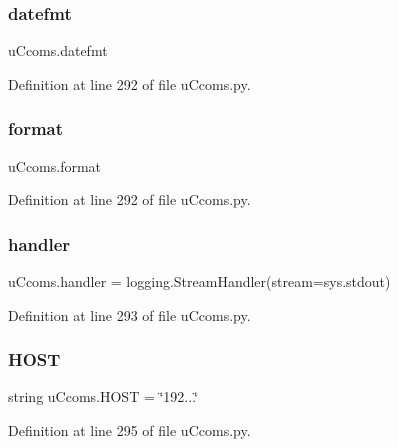 \subsubsection{\texorpdfstring{datefmt}{datefmt}}
{\footnotesize\ttfamily u\+Ccoms.\+datefmt}



Definition at line 292 of file u\+Ccoms.\+py.

\mbox{\label{namespaceu_ccoms_a1070a9e7db6d33b9ffcd595bdecd97a2}} 
\subsubsection{\texorpdfstring{format}{format}}
{\footnotesize\ttfamily u\+Ccoms.\+format}



Definition at line 292 of file u\+Ccoms.\+py.

\mbox{\label{namespaceu_ccoms_abcdcaa8cce9916174e18e8c89c6ca6aa}} 
\subsubsection{\texorpdfstring{handler}{handler}}
{\footnotesize\ttfamily u\+Ccoms.\+handler = logging.\+Stream\+Handler(stream=sys.\+stdout)}



Definition at line 293 of file u\+Ccoms.\+py.

\mbox{\label{namespaceu_ccoms_a90271686cb28137e4120a2fe5fff5ff2}} 
\subsubsection{\texorpdfstring{HOST}{HOST}}
{\footnotesize\ttfamily string u\+Ccoms.\+H\+O\+ST = \char`\"{}192...\char`\"{}}



Definition at line 295 of file u\+Ccoms.\+py.

\mbox{\label{namespaceu_ccoms_a98aa900adb18322c69550a67c72e2b0d}} 
